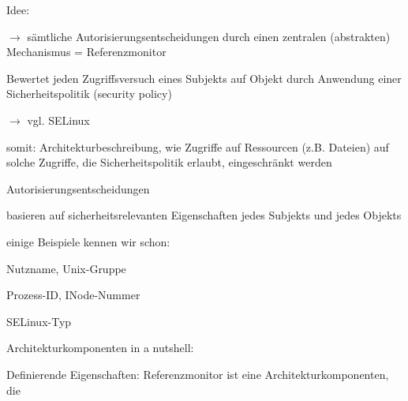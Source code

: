 \documentclass[a4paper]{article}
\begin{document}
\begin{multicols}{3}
    \begin{itemize*}
        \item
        Idee:
        \begin{itemize*}
            \item[$\rightarrow$] sämtliche Autorisierungsentscheidungen durch einen zentralen (abstrakten) Mechanismus = Referenzmonitor
            \item Bewertet jeden Zugriffsversuch eines Subjekts auf Objekt durch Anwendung einer Sicherheitspolitik (security policy) \begin{itemize*} \item[$\rightarrow$] vgl. SELinux \end{itemize*}
            \item somit: Architekturbeschreibung, wie Zugriffe auf Ressourcen (z.B. Dateien) auf solche Zugriffe, die Sicherheitspolitik erlaubt, eingeschränkt werden
        \end{itemize*}
        \item
        Autorisierungsentscheidungen
        \begin{itemize*}
            \item basieren auf sicherheitsrelevanten Eigenschaften jedes Subjekts und jedes Objekts
            \item einige Beispiele kennen wir schon: \begin{itemize*} \item Nutzname, Unix-Gruppe \item Prozess-ID, INode-Nummer \item SELinux-Typ \end{itemize*}
        \end{itemize*}
        \item
        Architekturkomponenten in a nutshell:
    \end{itemize*}

    Definierende Eigenschaften: Referenzmonitor ist eine
    Architekturkomponenten, die


\end{multicols}
\end{document}
